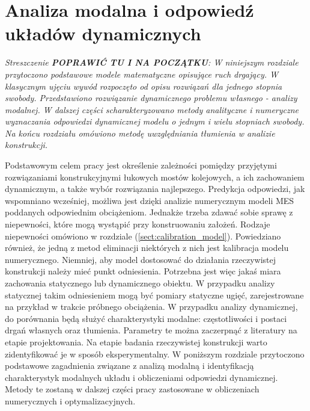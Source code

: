 \chapter{Analiza modalna i odpowiedź układów dynamicznych} \label{sect:modal_analysis_and_response}

\textit{Streszczenie \textbf{POPRAWIĆ TU I NA POCZĄTKU}: W niniejszym rozdziale przytoczono podstawowe modele matematyczne opisujące ruch drgający. W klasycznym ujęciu wywód rozpoczęto od opisu rozwiązań dla jednego stopnia swobody. Przedstawiono rozwiązanie dynamicznego problemu własnego - analizy modalnej. W dalszej części scharakteryzowano metody analityczne i numeryczne wyznaczania odpowiedzi dynamicznej modelu o jednym i wielu stopniach swobody. Na końcu rozdziału omówiono metodę uwzględniania tłumienia w analizie konstrukcji.}

\vspace{1cm}


Podstawowym celem pracy jest określenie zależności pomiędzy przyjętymi rozwiązaniami konstrukcyjnymi łukowych mostów kolejowych, a ich zachowaniem dynamicznym, a także wybór rozwiązania najlepszego. Predykcja odpowiedzi, jak wspomniano wcześniej, możliwa jest dzięki analizie numerycznym modeli MES poddanych odpowiednim obciążeniom. Jednakże trzeba zdawać sobie sprawę z niepewności, które mogą wystąpić przy konstruowaniu założeń. Rodzaje niepewności omówiono w rozdziale (\ref{sect:calibration_model}). Powiedziano również, że jedną z metod eliminacji niektórych z nich jest kalibracja modelu numerycznego. Niemniej, aby model dostosować do działania rzeczywistej konstrukcji należy mieć punkt odniesienia. Potrzebna jest więc jakaś miara zachowania statycznego lub dynamicznego obiektu. W przypadku analizy statycznej takim odniesieniem mogą być pomiary statyczne ugięć, zarejestrowane na przykład w trakcie próbnego obciążenia. W przypadku analizy dynamicznej, do porównania będą służyć charakterystyki modalne: częstotliwości i postaci drgań własnych oraz tłumienia. Parametry te można zaczerpnąć z literatury na etapie projektowania. Na etapie badania rzeczywistej konstrukcji warto zidentyfikować je w sposób eksperymentalny. W poniższym rozdziale przytoczono podstawowe zagadnienia związane z analizą modalną i identyfikacją charakterystyk modalnych układu i  obliczeniami odpowiedzi dynamicznej. Metody te zostaną w dalszej części pracy zastosowane w obliczeniach numerycznych i optymalizacyjnych.

